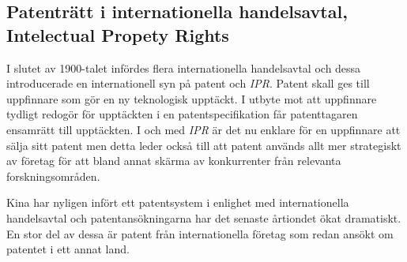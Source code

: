 \subsection{Patenträtt i internationella handelsavtal, Intelectual Propety Rights}

I slutet av 1900-talet infördes flera internationella handelsavtal och dessa introducerade en
internationell syn på patent och \emph{IPR}. Patent skall ges till uppfinnare som gör en
ny teknologisk upptäckt. I utbyte mot att uppfinnare tydligt redogör för upptäckten i en
patentspecifikation får patenttagaren ensamrätt till upptäckten. I och med \emph{IPR} är det nu enklare för en uppfinnare att sälja sitt patent men detta leder också till att patent används allt mer strategiskt av företag för att bland annat skärma av konkurrenter från relevanta forskningsområden.

Kina har nyligen infört ett patentsystem i enlighet med internationella handelsavtal och patentansökningarna har det senaste årtiondet ökat dramatiskt. En stor del av dessa är patent från internationella företag som redan ansökt om patentet i ett annat land.

%
%
%
